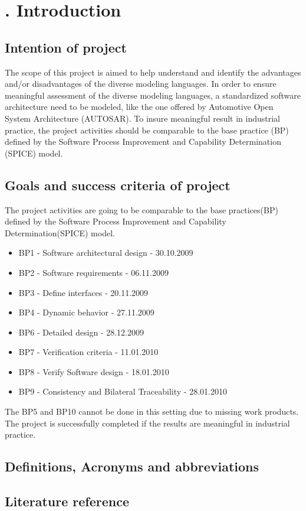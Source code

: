 \chapter[Introduction]{\thechapter. Introduction}
\section{Intention of project}
The scope of this project is aimed to help understand and identify the advantages and/or disadvantages of the diverse modeling languages. \newline
In order to ensure meaningful assessment of the diverse modeling languages, a standardized software architecture need to be modeled, like the one offered by Automotive Open System Architecture (AUTOSAR).\newline
To insure meaningful result in industrial practice, the project activities should be comparable to the base practice (BP) defined by the Software Process Improvement and Capability Determination (SPICE) model.
\section{Goals and success criteria of project}
The project activities are going to be comparable to the base practices(BP) defined by the Software Process Improvement and Capability Determination(SPICE) model.
\begin{itemize}
\item BP1 - Software architectural design - 30.10.2009
\item BP2 - Software requirements - 06.11.2009
\item BP3 - Define interfaces - 20.11.2009
\item BP4 - Dynamic behavior - 27.11.2009
\item BP6 - Detailed design - 28.12.2009
\item BP7 - Verification criteria - 11.01.2010
\item BP8 - Verify Software design - 18.01.2010
\item BP9 - Consistency and Bilateral Traceability - 28.01.2010
\end{itemize}
The BP5 and BP10 cannot be done in this setting due to missing work products. The project is successfully completed if the results are meaningful in industrial practice.
\section{Definitions, Acronyms and abbreviations}
\section{Literature reference}